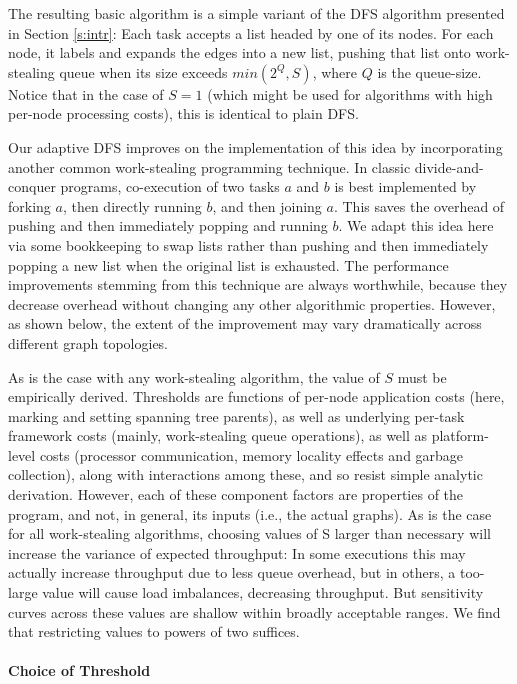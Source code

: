 The resulting basic algorithm is a simple variant of the DFS algorithm
presented in Section \ref{s:intr}: Each task accepts a list headed by one of its
nodes.  For each node, it labels and expands the edges into a new
list, pushing that list onto work-stealing queue when its size
exceeds $min(2^{Q}, S)$, where $Q$ is the queue-size. Notice that in
the case of $S=1$ (which might be used for algorithms with high
per-node processing costs), this is identical to plain DFS.

Our adaptive DFS improves on the implementation of this idea by
incorporating another common work-stealing programming technique. In
classic divide-and-conquer programs, co-execution of two tasks $a$ and $b$
is best implemented by forking $a$, then directly running $b$, and then
joining $a$.  This saves the overhead of pushing and then immediately
popping and running $b$.  We adapt this idea here via some bookkeeping
to swap lists rather than pushing and then immediately popping a new
list when the original list is exhausted. The performance improvements
stemming from this technique are always worthwhile, because they
decrease overhead without changing any other algorithmic
properties. However, as shown below, the extent of the improvement may
vary dramatically across different graph topologies.

As is the case with any work-stealing algorithm, the value of $S$ must
be empirically derived. Thresholds are functions of per-node
application costs (here, marking and setting spanning tree parents),
as well as underlying per-task framework costs (mainly, work-stealing
queue operations), as well as platform-level costs (processor
communication, memory locality effects and  garbage collection), along
with interactions among these, and so resist simple analytic
derivation.  However, each of these component factors are properties
of the program, and not, in general, its inputs (i.e., the actual
graphs).  As is the case for all work-stealing algorithms, choosing
values of S larger than necessary will increase the variance of
expected throughput: In some executions this may actually increase
throughput due to less queue overhead, but in others, a too-large
value will cause load imbalances, decreasing throughput.  But
sensitivity curves across these values are shallow within broadly
acceptable ranges. We find that restricting values to powers of two
suffices.

\paragraph{Choice of Threshold}

